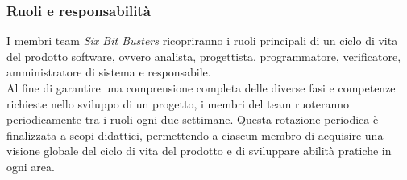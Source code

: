         \subsubsection{Ruoli e responsabilità}
            I membri team \textit{Six Bit Busters} ricopriranno i ruoli principali 
            di un ciclo di vita del prodotto software, ovvero analista, 
            progettista, programmatore, verificatore, amministratore di sistema e responsabile. 
            \\Al fine di garantire una comprensione completa delle diverse fasi 
            e competenze richieste nello sviluppo di un progetto, i membri del team 
            ruoteranno periodicamente tra i ruoli ogni due settimane. Questa rotazione 
            periodica è finalizzata a scopi didattici, permettendo a ciascun membro di 
            acquisire una visione globale del ciclo di vita del prodotto e di sviluppare 
            abilità pratiche in ogni area.
